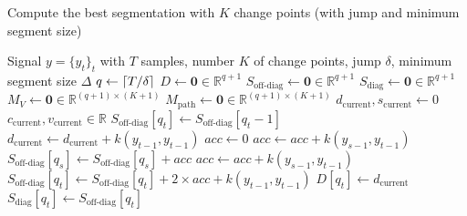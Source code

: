 \documentclass[12pt]{article}
\newcommand\RR{\mathbb{R}}
\DeclarePairedDelimiter\ceil{\lceil}{\rceil}
\begin{document}
\begin{algorithm}
    \scriptsize
    \caption{Compute the best segmentation with $K$ change points (with jump and minimum segment size)} %
    \label{alg:dynp_jump_min_size} %
    \begin{algorithmic} %
        \REQUIRE Signal $y = \{y_t\}_t$ with $T$ samples, number $K$ of change points, jump $\delta$, minimum segment size $\Delta$
        \STATE {}
        \STATE $q\gets \ceil{T/\delta}$ 
        \STATE $D \gets \bm{0}\in\mathbb{R}^{q+1}$ 
        \STATE $S_{\text{off-diag}} \gets \bm{0}\in\mathbb{R}^{q+1}$ 
        \STATE $S_{\text{diag}} \gets \bm{0}\in\mathbb{R}^{q+1}$ 
        \STATE $M_V \gets \bm{0}\in\mathbb{R}^{(q+1)\times (K+1)}$ 
        \STATE $M_{\text{path}} \gets \bm{0}\in\mathbb{R}^{(q+1)\times (K+1)}$ 
        \STATE $d_{\text{current}},s_{\text{current}}\gets0$ 
        \STATE $c_{\text{current}}, v_{\text{current}}\in\RR$ 
        \STATE
        \STATE $S_{\text{off-diag}}[q_t]\gets S_{\text{off-diag}}[q_t-1]$
        \STATE $d_{\text{current}}\gets d_{\text{current}} + k(y_{t-1}, y_{t-1})$
        \STATE {}
        \STATE $acc\gets0$
        \STATE $acc \gets acc + k(y_{s-1}, y_{t-1})$
        \ENDFOR
        \STATE $S_{\text{off-diag}}[q_s] \gets S_{\text{off-diag}}[q_s] + acc$ 
        \ENDFOR
        \STATE $acc \gets acc + k(y_{s-1}, y_{t-1})$
        \ENDFOR
        \STATE $S_{\text{off-diag}}[q_t] \gets S_{\text{off-diag}}[q_t] + 2\times acc +  k(y_{t-1}, y_{t-1})$
        \ENDFOR
        \STATE $D[q_t] \gets d_{\text{current}}$ 
        \STATE $S_{\text{diag}}[q_t] \gets S_{\text{off-diag}}[q_t]$

\end{algorithmic}
\end{algorithm}
\end{document}
